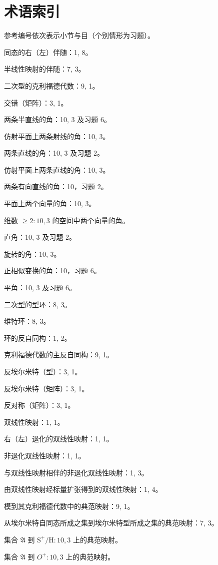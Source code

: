 \chapter*{术语索引}
{}

参考编号依次表示小节与目（个别情形为习题）。

同态的右（左）伴随：1, 8。

半线性映射的伴随：7, 3。

二次型的克利福德代数：9, 1。

交错（矩阵）：3, 1。

两条半直线的角：10, 3 及习题 6。

仿射平面上两条射线的角：10, 3。

两条直线的角：10, 3 及习题 2。

仿射平面上两条直线的角：10, 3。

两条有向直线的角：10，习题 2。

平面上两个向量的角：10, 3。

维数 \(\geqslant 2:10,3\) 的空间中两个向量的角。

直角：10, 3 及习题 2。

旋转的角：10, 3。

正相似变换的角：10，习题 6。

平角：10, 3 及习题 6。

二次型的型环：8, 3。

维特环：8, 3。

环的反自同构：1, 2。

克利福德代数的主反自同构：9, 1。

反埃尔米特（型）：3, 1。

反埃尔米特（矩阵）：3, 1。

反对称（矩阵）：3, 1。

双线性映射：1, 1。

右（左）退化的双线性映射：1, 1。

非退化双线性映射：1, 1。

与双线性映射相伴的非退化双线性映射：1, 3。

由双线性映射经标量扩张得到的双线性映射：1, 4。

模到其克利福德代数中的典范映射：9, 1。

从埃尔米特自同态所成之集到埃尔米特型所成之集的典范映射：7, 3。

集合 \(\mathfrak{A}\) 到 \(\mathrm{S}^{+}/\mathrm{H}:10,3\) 上的典范映射。

集合 \(\mathfrak{A}\) 到 \(O^{+}:10,3\) 上的典范映射。

